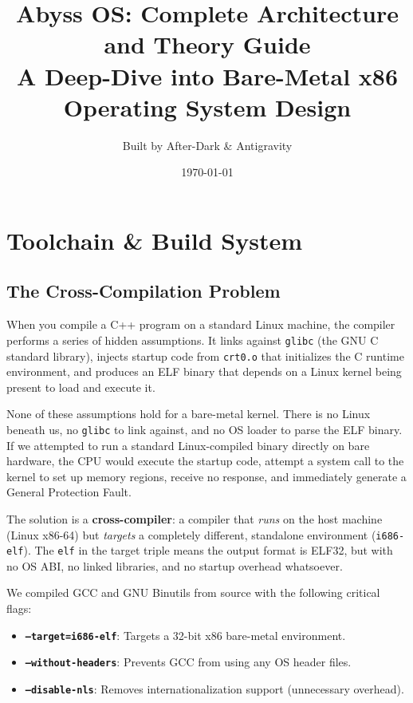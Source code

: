 \documentclass[12pt,a4paper]{report}
\title{\textbf{Abyss OS: Complete Architecture and Theory Guide}\\[1em]
\large A Deep-Dive into Bare-Metal x86 Operating System Design}
\author{Built by After-Dark \& Antigravity}
\date{\today}
\begin{document}
\maketitle
\tableofcontents
\newpage

\chapter{Toolchain \& Build System}

\section{The Cross-Compilation Problem}

When you compile a C++ program on a standard Linux machine, the compiler performs
a series of hidden assumptions. It links against \texttt{glibc} (the GNU C standard
library), injects startup code from \texttt{crt0.o} that initializes the C runtime
environment, and produces an ELF binary that depends on a Linux kernel being present
to load and execute it.

None of these assumptions hold for a bare-metal kernel. There is no Linux beneath us,
no \texttt{glibc} to link against, and no OS loader to parse the ELF binary. If we
attempted to run a standard Linux-compiled binary directly on bare hardware, the CPU
would execute the startup code, attempt a system call to the kernel to set up memory
regions, receive no response, and immediately generate a General Protection Fault.

The solution is a \textbf{cross-compiler}: a compiler that \textit{runs} on the host
machine (Linux x86-64) but \textit{targets} a completely different, standalone
environment (\texttt{i686-elf}). The \texttt{elf} in the target triple means the
output format is ELF32, but with no OS ABI, no linked libraries, and no startup
overhead whatsoever.

We compiled GCC and GNU Binutils from source with the following critical flags:
\begin{itemize}
    \item \textbf{\texttt{--target=i686-elf}}: Targets a 32-bit x86 bare-metal environment.
    \item \textbf{\texttt{--without-headers}}: Prevents GCC from using any OS header files.
    \item \textbf{\texttt{--disable-nls}}: Removes internationalization support (unnecessary overhead).
\end{itemize}
\end{document}

